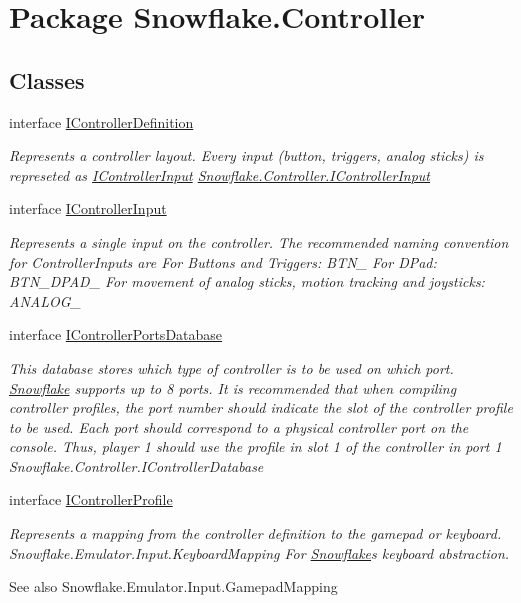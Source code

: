 \hypertarget{namespace_snowflake_1_1_controller}{}\section{Package Snowflake.\+Controller}
\label{namespace_snowflake_1_1_controller}
\subsection*{Classes}
\begin{DoxyCompactItemize}
\item 
interface \hyperlink{interface_snowflake_1_1_controller_1_1_i_controller_definition}{I\+Controller\+Definition}
\begin{DoxyCompactList}\small\item\em Represents a controller layout. Every input (button, triggers, analog sticks) is represeted as \hyperlink{interface_snowflake_1_1_controller_1_1_i_controller_input}{I\+Controller\+Input} \hyperlink{interface_snowflake_1_1_controller_1_1_i_controller_input}{Snowflake.\+Controller.\+I\+Controller\+Input} \end{DoxyCompactList}\item 
interface \hyperlink{interface_snowflake_1_1_controller_1_1_i_controller_input}{I\+Controller\+Input}
\begin{DoxyCompactList}\small\item\em Represents a single input on the controller. The recommended naming convention for Controller\+Inputs are For Buttons and Triggers\+: B\+T\+N\+\_\+ For D\+Pad\+: B\+T\+N\+\_\+\+D\+P\+A\+D\+\_\+ For movement of analog sticks, motion tracking and joysticks\+: A\+N\+A\+L\+O\+G\+\_\+ \end{DoxyCompactList}\item 
interface \hyperlink{interface_snowflake_1_1_controller_1_1_i_controller_ports_database}{I\+Controller\+Ports\+Database}
\begin{DoxyCompactList}\small\item\em This database stores which type of controller is to be used on which port. \hyperlink{namespace_snowflake}{Snowflake} supports up to 8 ports. It is recommended that when compiling controller profiles, the port number should indicate the slot of the controller profile to be used. Each port should correspond to a physical controller port on the console. Thus, player 1 should use the profile in slot 1 of the controller in port 1 Snowflake.\+Controller.\+I\+Controller\+Database \end{DoxyCompactList}\item 
interface \hyperlink{interface_snowflake_1_1_controller_1_1_i_controller_profile}{I\+Controller\+Profile}
\begin{DoxyCompactList}\small\item\em Represents a mapping from the controller definition to the gamepad or keyboard. Snowflake.\+Emulator.\+Input.\+Keyboard\+Mapping For \hyperlink{namespace_snowflake}{Snowflake}\textquotesingle{}s keyboard abstraction. \begin{DoxySeeAlso}{See also}
Snowflake.\+Emulator.\+Input.\+Gamepad\+Mapping



\end{DoxySeeAlso}
\end{DoxyCompactList}
\end{DoxyCompactItemize}
